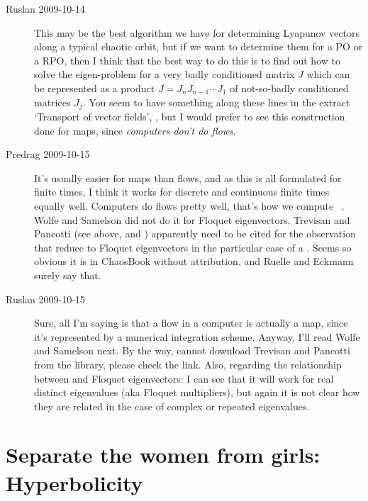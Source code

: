\begin{description}
  \item[Ruslan 2009-10-14]
 This may be the best
algorithm we have for determining Lyapunov vectors along a
typical chaotic orbit, but if we want to determine them for a
PO or a RPO, then I think that the best way to do this is to
find out how to solve the eigen-problem for a very badly
conditioned matrix $J$ which can be represented as a product
$J = J_{n}J_{n-1}\cdots J_1$ of not-so-badly conditioned
matrices $J_j$.  You seem to have something along these lines
in the extract `Transport of vector fields', , but I
would prefer to see this construction done for maps, since
\emph{computers don't do flows}.


\item[Predrag 2009-10-15]
It's usually easier for maps than flows, and as this is all
formulated for finite times, I think it works for discrete
and continuous finite times equally well. Computers do flows
pretty well, that's how we compute \FloquetM\ \monodromy.
Wolfe and Samelson did not do it for Floquet
eigenvectors. Trevisan and Pancotti (see above, and
) apparently need to be cited for the
observation that {\cLvs} reduce to Floquet
eigenvectors in the particular case of a {\po}.
Seems so obvious it is in ChaosBook without attribution, and
Ruelle and Eckmann surely say that.

\item[Ruslan 2009-10-15]
Sure, all I'm saying is that a flow in a computer is actually
a map, since it's represented by a numerical integration
scheme.  Anyway, I'll read Wolfe and Samelson
next.  By the way, cannot download Trevisan and Pancotti from
the library, please check the link.  Also, regarding the
relationship between  {\cLvs} and Floquet
eigenvectors: I can see that it will work for real distinct
eigenvalues (aka Floquet multipliers), but again it is not
clear how they are related in the case of complex or repeated
eigenvalues.

\end{description}


\section{Separate the women from girls:
		 Hyperbolicity}


